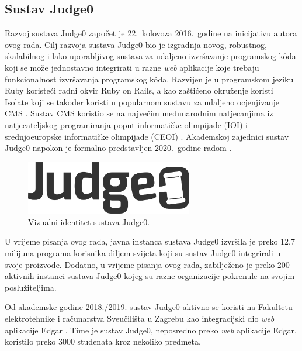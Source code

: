 \documentclass[times, utf8, diplomski]{fer}
\begin{document}
\pagebreak

\subsection{Sustav Judge0}
Razvoj sustava Judge0 započet je 22.\ kolovoza 2016.\ godine na inicijativu autora ovog rada. Cilj razvoja sustava Judge0 bio je izgradnja novog, robustnog, skalabilnog i lako uporabljivog sustava za udaljeno izvršavanje programskog kôda koji se može jednostavno integrirati u razne \textit{web} aplikacije koje trebaju funkcionalnost izvršavanja programskog kôda. Razvijen je u programskom jeziku Ruby koristeći radni okvir Ruby on Rails, a kao zaštićeno okruženje koristi Isolate \citep{marevs2012new} koji se također koristi u popularnom sustavu za udaljeno ocjenjivanje CMS \citep{maggiolo2012introducing}. Sustav CMS koristio se na najvećim međunarodnim natjecanjima iz natjecateljskog programiranja poput informatičke olimpijade (IOI) i srednjoeuropske informatičke olimpijade (CEOI) \citep{CMSWeb}. Akademskoj zajednici sustav Judge0 napokon je formalno predstavljen 2020.\ godine radom \citep{9245310}.

\begin{figure}[htb]
	\centering
	\includegraphics[width=0.65\textwidth]{images/Judge0 Logo.png}
	\caption[]{
	    Vizualni identitet sustava Judge0.\footnotemark
	}
\end{figure}


U vrijeme pisanja ovog rada, javna instanca sustava Judge0 izvršila je preko 12,7 milijuna programa korisnika diljem svijeta koji su sustav Judge0 integrirali u svoje proizvode. Dodatno, u vrijeme pisanja ovog rada, zabilježeno je preko 200 aktivnih instanci sustava Judge0 kojeg su razne organizacije pokrenule na svojim poslužiteljima. 

Od akademske godine 2018./2019. sustav Judge0 aktivno se koristi na Fakultetu elektrotehnike i računarstva Sveučilišta u Zagrebu kao integracijski dio \textit{web} aplikacije Edgar \citep{mekterovic2020building}. Time je sustav Judge0, neposredno preko \textit{web} aplikacije Edgar, koristilo preko 3000 studenata kroz nekoliko predmeta.
\end{document}
